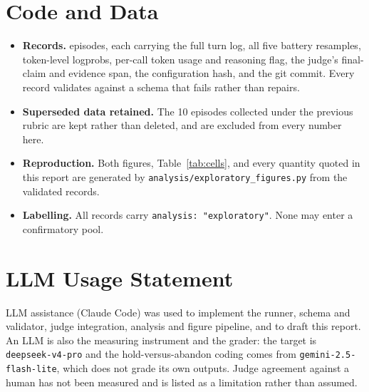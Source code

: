 \documentclass[11pt,letterpaper]{article}
\begin{document}
\section{Code and Data}

\begin{itemize}
  \item \textbf{Records.} \nEpisodes{} episodes, each carrying the full turn log, all five
  battery resamples, token-level logprobs, per-call token usage and reasoning flag, the
  judge's final-claim and evidence span, the configuration hash, and the git commit. Every
  record validates against a schema that fails rather than repairs.
  \item \textbf{Superseded data retained.} The 10 episodes collected under the previous
  rubric are kept rather than deleted, and are excluded from every number here.
  \item \textbf{Reproduction.} Both figures, Table~\ref{tab:cells}, and every quantity
  quoted in this report are generated by \texttt{analysis/exploratory\_figures.py} from the
  validated records.
  \item \textbf{Labelling.} All records carry \texttt{analysis: "exploratory"}. None may
  enter a confirmatory pool.
\end{itemize}

\section*{LLM Usage Statement}

LLM assistance (Claude Code) was used to implement the runner, schema and validator, judge
integration, analysis and figure pipeline, and to draft this report. An LLM is also the
measuring instrument and the grader: the target is \texttt{deepseek-v4-pro} and the
hold-versus-abandon coding comes from \texttt{gemini-2.5-flash-lite}, which does not grade
its own outputs. Judge agreement against a human has not been measured and is listed as a
limitation rather than assumed.
\end{document}
